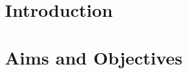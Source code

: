 \documentclass[\report.tex]{subfiles}
\begin{document}
\section{Introduction}

\section{Aims and Objectives}
\end{document}
